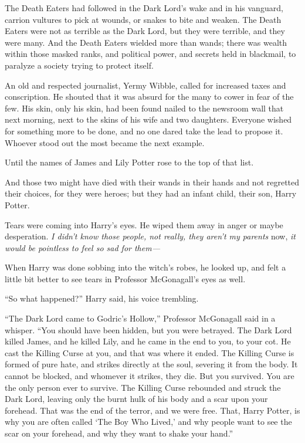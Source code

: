 The Death Eaters had followed in the Dark Lord’s wake and in his vanguard,
carrion vultures to pick at wounds, or snakes to bite and weaken. The Death
Eaters were not as terrible as the Dark Lord, but they were terrible, and they
were many. And the Death Eaters wielded more than wands; there was wealth
within those masked ranks, and political power, and secrets held in blackmail,
to paralyze a society trying to protect itself.

An old and respected journalist, Yermy Wibble, called for increased taxes and
conscription. He shouted that it was absurd for the many to cower in fear of
the few. His skin, only his skin, had been found nailed to the newsroom wall
that next morning, next to the skins of his wife and two daughters. Everyone
wished for something more to be done, and no one dared take the lead to propose
it. Whoever stood out the most became the next example.

Until the names of James and Lily Potter rose to the top of that list.

And those two might have died with their wands in their hands and not regretted
their choices, for they were heroes; but they had an infant
child, their son, Harry Potter.

Tears were coming into Harry’s eyes. He wiped them away in anger or maybe
desperation. \emph{I didn’t know those people, not really, they aren’t my
parents} now, \emph{it would be pointless to feel so sad for them—}

When Harry was done sobbing into the witch’s robes, he looked up, and felt a
little bit better to see tears in Professor McGonagall’s eyes as well.

“So what happened?” Harry said, his voice trembling.

“The Dark Lord came to Godric’s Hollow,” Professor McGonagall said in a
whisper. “You should have been hidden, but you were betrayed. The Dark Lord
killed James, and he killed Lily, and he came in the end to you, to your cot.
He cast the Killing Curse at you, and that was where it ended. The Killing
Curse is formed of pure hate, and strikes directly at the soul, severing it
from the body. It cannot be blocked, and whomever it strikes, they die. But you
survived. You are the only person ever to survive. The Killing Curse rebounded
and struck the Dark Lord, leaving only the burnt hulk of his body and a scar
upon your forehead. That was the end of the terror, and we were free. That,
Harry Potter, is why you are often called `The Boy Who Lived,’
and why people want to see the scar on your forehead, and why they
want to shake your hand.”

